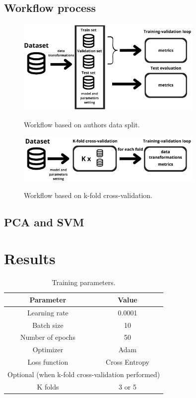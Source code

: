 \documentclass[runningheads]{llncs}
\begin{document}
\subsection{Workflow process}
\begin{figure}[h]
\centering
{
\includegraphics[width=0.80\textwidth]{LaTeX_script/Schema/workflow2.png}
}
\label{SimpleCNNs}
\caption{Workflow based on authors data split.}
\end{figure}

\begin{figure}[h]
\centering
{
\includegraphics[width=0.80\textwidth]{LaTeX_script/Schema/workflow1.png}
}
\label{SimpleCNNs}
\caption{Workflow based on k-fold cross-validation.}
\end{figure}
\subsection{PCA and SVM}

\section{Results}
\begin{table}[]
\caption{Training parameters.}
\centering
\begin{tabular}{|cc|}
\hline
\multicolumn{1}{|c|}{Parameter }     & Value              \\ \hline
\multicolumn{1}{|c|}{Learning rate} & 0.0001   \\ \hline
\multicolumn{1}{|c|}{Batch size}        & 10                       \\ \hline
\multicolumn{1}{|c|}{Number of epochs }     & 50 \\ \hline
\multicolumn{1}{|c|}{Optimizer}           & Adam                   \\ \hline
\multicolumn{1}{|c|}{Loss function}           & Cross Entropy                   \\ \hline
\multicolumn{2}{|c|}{Optional (when k-fold cross-validation performed)}                                          \\ \hline
\multicolumn{1}{|c|}{K folds}       & 3 or 5                  \\ \hline
\end{tabular}
\end{table}
\end{document}
